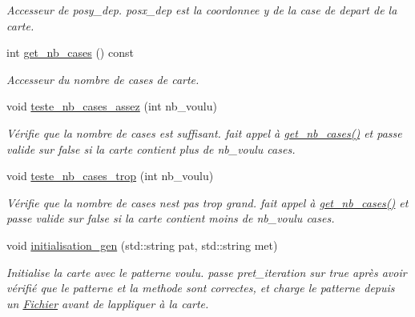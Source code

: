\begin{DoxyCompactItemize}
\begin{DoxyCompactList}\small\item\em Accesseur de {\itshape posy\+\_\+dep}. posx\+\_\+dep est la coordonnee y de la case de depart de la {\itshape carte}. \end{DoxyCompactList}\item 
int \hyperlink{classZoneGen_a76588fc3a5d361a213ec28692b8abcdc}{get\+\_\+nb\+\_\+cases} () const 
\begin{DoxyCompactList}\small\item\em \textquotesingle{}Accesseur\textquotesingle{} du nombre de cases de {\itshape carte}. \end{DoxyCompactList}\item 
void \hyperlink{classZoneGen_a881eb249ee86fa522c58e7f42f651c85}{teste\+\_\+nb\+\_\+cases\+\_\+assez} (int nb\+\_\+voulu)
\begin{DoxyCompactList}\small\item\em Vérifie que la nombre de cases est suffisant. fait appel à \hyperlink{classZoneGen_a76588fc3a5d361a213ec28692b8abcdc}{get\+\_\+nb\+\_\+cases()} et passe {\itshape valide} sur false si la {\itshape carte} contient plus de nb\+\_\+voulu cases. \end{DoxyCompactList}\item 
void \hyperlink{classZoneGen_a47825d838930c2f8657044353767f222}{teste\+\_\+nb\+\_\+cases\+\_\+trop} (int nb\+\_\+voulu)
\begin{DoxyCompactList}\small\item\em Vérifie que la nombre de cases n\textquotesingle{}est pas trop grand. fait appel à \hyperlink{classZoneGen_a76588fc3a5d361a213ec28692b8abcdc}{get\+\_\+nb\+\_\+cases()} et passe {\itshape valide} sur false si la {\itshape carte} contient moins de nb\+\_\+voulu cases. \end{DoxyCompactList}\item 
void \hyperlink{classZoneGen_aa08565e6eb38911c72143aacfced7b91}{initialisation\+\_\+gen} (std\+::string pat, std\+::string met)
\begin{DoxyCompactList}\small\item\em Initialise la {\itshape carte} avec le patterne voulu. passe {\itshape pret\+\_\+iteration} sur true après avoir vérifié que le {\itshape patterne} et la {\itshape methode} sont correctes, et charge le patterne depuis un \hyperlink{classFichier}{Fichier} avant de l\textquotesingle{}appliquer à la {\itshape carte}. \end{DoxyCompactList}\item 

\end{DoxyCompactItemize}

